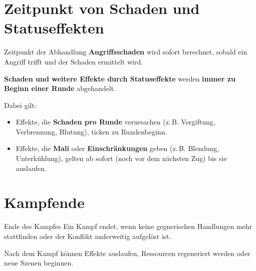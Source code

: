 \section{Zeitpunkt von Schaden und Statuseffekten}

\begin{rulebox}{Zeitpunkt der Abhandlung}
	\textbf{Angriffsschaden} wird sofort berechnet, sobald ein Angriff trifft und der Schaden ermittelt wird.
	
	\textbf{Schaden und weitere Effekte durch Statuseffekte} werden \textbf{immer zu Beginn einer Runde} abgehandelt.
\end{rulebox}

Dabei gilt:
\begin{itemize}
	\item Effekte, die \textbf{Schaden pro Runde} verursachen (z.\,B. Vergiftung, Verbrennung, Blutung), ticken zu Rundenbeginn.
	\item Effekte, die \textbf{Mali} oder \textbf{Einschränkungen} geben (z.\,B. Blendung, Unterkühlung), gelten ab sofort (noch vor dem nächsten Zug) bis sie auslaufen.
\end{itemize}


\section{Kampfende}

\begin{rulebox}{Ende des Kampfes}
	Ein Kampf endet, wenn keine gegnerischen Handlungen mehr stattfinden oder der
	Konflikt anderweitig aufgelöst ist.
\end{rulebox}

Nach dem Kampf können Effekte auslaufen, Ressourcen regeneriert werden oder
neue Szenen beginnen.
